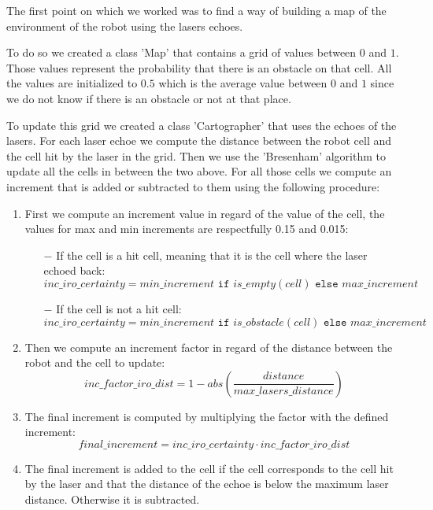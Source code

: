 The first point on which we worked was to find a way of building a map of the environment of the robot using the lasers echoes.

To do so we created a class 'Map' that contains a grid of values between $0$ and $1$.
Those values represent the probability that there is an obstacle on that cell.
All the values are initialized to $0.5$ which is the average value between $0$ and $1$ since we do not know if there is an obstacle or not at that place.

To update this grid we created a class 'Cartographer' that uses the echoes of the lasers.
For each laser echoe we compute the distance between the robot cell and the cell hit by the laser in the grid.
Then we use the 'Bresenham' algorithm\cite{bresenham} to update all the cells in between the two above.
For all those cells we compute an increment that is added or subtracted to them using the following procedure:

\begin{enumerate}
    \item First we compute an increment value in regard of the value of the cell, the values for max and min increments are respectfully 0.15 and 0.015:
        \begin{itemize}
            \item[$-$] If the cell is a hit cell, meaning that it is the cell where the laser echoed back:
            $$
                inc\_iro\_certainty = min\_increment\texttt{ if }is\_empty(cell)\texttt{ else }max\_increment
            $$
            \item[$-$] If the cell is not a hit cell:
            $$
                inc\_iro\_certainty = min\_increment\texttt{ if }is\_obstacle(cell)\texttt{ else }max\_increment
            $$
        \end{itemize}
    \item Then we compute an increment factor in regard of the distance between the robot and the cell to update:
        $$
        inc\_factor\_iro\_dist = 1 - abs(\dfrac{distance}{max\_lasers\_distance})
        $$
    \item The final increment is computed by multiplying the factor with the defined increment:
        $$
        final\_increment = inc\_iro\_certainty \cdot inc\_factor\_iro\_dist
        $$
    \item The final increment is added to the cell if the cell corresponds to the cell hit by the laser and that the distance of the echoe is below the maximum laser distance.
        Otherwise it is subtracted.
\end{enumerate}

